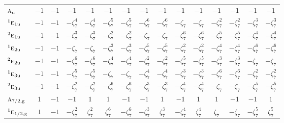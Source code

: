 \documentclass[10pt,a4paper]{article}
\makeatletter
\def\grouprule#1#2{\noalign{\marks\LTgroupmarks{\the\belowrulesep}\nobreak\vskip#1%
  \vskip\aboverulesep}\multispan\LT@cols\unskip{\leaders\hrule\@height#2\hfill\kern\z@}\cr
  \noalign{\penalty\LTrulebreak\vskip\belowrulesep\global\@lastruleclass\z@}}
\numberwithin{equation}{section}
\newcommand{\irr}[1]{\text{\normalfont\scshape #1}}
\newcommand{\conjpair}[1]{{}^{#1}}
\newcommand{\ptag}[1]{\mathrm{#1}}
\newcommand{\rootunity}[1]{\zeta_{#1}}
\makeatother
\begin{document}
{\begin{longtable}{@{}lcccccccccccccc@{}}
$\irr{a}_{\ptag{u}}$ & $-1$ & $-1$ & $-1$ & $-1$ & $-1$ & $-1$ & $-1$ & $-1$ & $-1$ & $-1$ & $-1$ & $-1$ & $-1$ & $-1$\\
$\conjpair{1}\irr{e}_{1\ptag{u}}$ & $-1$ & $-1$ & $-\rootunity{7}^{4}$ & $-\rootunity{7}^{4}$ & $-\rootunity{7}^{5}$ & $-\rootunity{7}^{5}$ & $-\rootunity{7}^{6}$ & $-\rootunity{7}^{6}$ & $-\rootunity{7}$ & $-\rootunity{7}$ & $-\rootunity{7}^{2}$ & $-\rootunity{7}^{2}$ & $-\rootunity{7}^{3}$ & $-\rootunity{7}^{3}$\\
$\conjpair{2}\irr{e}_{1\ptag{u}}$ & $-1$ & $-1$ & $-\rootunity{7}^{3}$ & $-\rootunity{7}^{3}$ & $-\rootunity{7}^{2}$ & $-\rootunity{7}^{2}$ & $-\rootunity{7}$ & $-\rootunity{7}$ & $-\rootunity{7}^{6}$ & $-\rootunity{7}^{6}$ & $-\rootunity{7}^{5}$ & $-\rootunity{7}^{5}$ & $-\rootunity{7}^{4}$ & $-\rootunity{7}^{4}$\\
$\conjpair{1}\irr{e}_{2\ptag{u}}$ & $-1$ & $-1$ & $-\rootunity{7}$ & $-\rootunity{7}$ & $-\rootunity{7}^{3}$ & $-\rootunity{7}^{3}$ & $-\rootunity{7}^{5}$ & $-\rootunity{7}^{5}$ & $-\rootunity{7}^{2}$ & $-\rootunity{7}^{2}$ & $-\rootunity{7}^{4}$ & $-\rootunity{7}^{4}$ & $-\rootunity{7}^{6}$ & $-\rootunity{7}^{6}$\\
$\conjpair{2}\irr{e}_{2\ptag{u}}$ & $-1$ & $-1$ & $-\rootunity{7}^{6}$ & $-\rootunity{7}^{6}$ & $-\rootunity{7}^{4}$ & $-\rootunity{7}^{4}$ & $-\rootunity{7}^{2}$ & $-\rootunity{7}^{2}$ & $-\rootunity{7}^{5}$ & $-\rootunity{7}^{5}$ & $-\rootunity{7}^{3}$ & $-\rootunity{7}^{3}$ & $-\rootunity{7}$ & $-\rootunity{7}$\\
$\conjpair{1}\irr{e}_{3\ptag{u}}$ & $-1$ & $-1$ & $-\rootunity{7}^{5}$ & $-\rootunity{7}^{5}$ & $-\rootunity{7}$ & $-\rootunity{7}$ & $-\rootunity{7}^{4}$ & $-\rootunity{7}^{4}$ & $-\rootunity{7}^{3}$ & $-\rootunity{7}^{3}$ & $-\rootunity{7}^{6}$ & $-\rootunity{7}^{6}$ & $-\rootunity{7}^{2}$ & $-\rootunity{7}^{2}$\\
$\conjpair{2}\irr{e}_{3\ptag{u}}$ & $-1$ & $-1$ & $-\rootunity{7}^{2}$ & $-\rootunity{7}^{2}$ & $-\rootunity{7}^{6}$ & $-\rootunity{7}^{6}$ & $-\rootunity{7}^{3}$ & $-\rootunity{7}^{3}$ & $-\rootunity{7}^{4}$ & $-\rootunity{7}^{4}$ & $-\rootunity{7}$ & $-\rootunity{7}$ & $-\rootunity{7}^{5}$ & $-\rootunity{7}^{5}$\\
\grouprule{0pt}{\lightrulewidth}
$\irr{a}_{7/2,\ptag{g}}$ & $1$ & $-1$ & $-1$ & $1$ & $1$ & $-1$ & $-1$ & $1$ & $-1$ & $1$ & $1$ & $-1$ & $-1$ & $1$\\
$\conjpair{1}\irr{e}_{1/2,\ptag{g}}$ & $1$ & $-1$ & $-\rootunity{7}^{2}$ & $\rootunity{7}^{2}$ & $\rootunity{7}^{6}$ & $-\rootunity{7}^{6}$ & $-\rootunity{7}^{3}$ & $\rootunity{7}^{3}$ & $-\rootunity{7}^{4}$ & $\rootunity{7}^{4}$ & $\rootunity{7}$ & $-\rootunity{7}$ & $-\rootunity{7}^{5}$ & $\rootunity{7}^{5}$\\

\end{longtable}}
\end{document}
